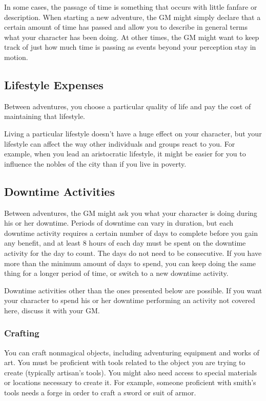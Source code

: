 In some cases, the passage of time is something that occurs with little fanfare or description. When starting a new adventure, the GM might simply declare that a certain amount of time has passed and allow you to describe in general terms what your character has been doing. At other times, the GM might want to keep track of just how much time is passing as events beyond your perception stay in motion.

\subsection{Lifestyle Expenses}

Between adventures, you choose a particular quality of life and pay the cost of maintaining that lifestyle.

Living a particular lifestyle doesn't have a huge effect on your character, but your lifestyle can affect the way other individuals and groups react to you. For example, when you lead an aristocratic lifestyle, it might be easier for you to influence the nobles of the city than if you live in poverty.

\subsection{Downtime Activities}

Between adventures, the GM might ask you what your character is doing during his or her downtime. Periods of downtime can vary in duration, but each downtime activity requires a certain number of days to complete before you gain any benefit, and at least 8 hours of each day must be spent on the downtime activity for the day to count. The days do not need to be consecutive. If you have more than the minimum amount of days to spend, you can keep doing the same thing for a longer period of time, or switch to a new downtime activity.

Downtime activities other than the ones presented below are possible. If you want your character to spend his or her downtime performing an activity not covered here, discuss it with your GM.

\subsubsection{Crafting}

You can craft nonmagical objects, including adventuring equipment and works of art. You must be proficient with tools related to the object you are trying to create (typically artisan's tools). You might also need access to special materials or locations necessary to create it. For example, someone proficient with smith's tools needs a forge in order to craft a sword or suit of armor.

